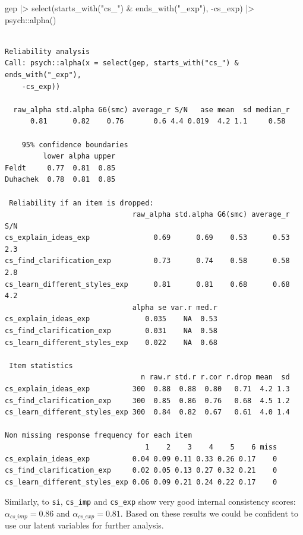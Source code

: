 \documentclass[
  letterpaper,
]{krantz}
\makeatletter
\newenvironment{Shaded}{\begin{snugshade}}{\end{snugshade}}
\newcommand{\FunctionTok}[1]{\textcolor[rgb]{0.28,0.35,0.67}{#1}}
\newcommand{\NormalTok}[1]{\textcolor[rgb]{0.00,0.23,0.31}{#1}}
\newcommand{\SpecialCharTok}[1]{\textcolor[rgb]{0.37,0.37,0.37}{#1}}
\newcommand{\StringTok}[1]{\textcolor[rgb]{0.13,0.47,0.30}{#1}}
\newenvironment{kframe}{%
\medskip{}
\setlength{\fboxsep}{.8em}
 \def\at@end@of@kframe{}%
 \ifinner\ifhmode%
  \def\at@end@of@kframe{\end{minipage}}%
  \begin{minipage}{\columnwidth}%
 \fi\fi%
 \def\FrameCommand##1{\hskip\@totalleftmargin \hskip-\fboxsep
 \colorbox{shadecolor}{##1}\hskip-\fboxsep
     \hskip-\linewidth \hskip-\@totalleftmargin \hskip\columnwidth}%
 \MakeFramed {\advance\hsize-\width
   \@totalleftmargin\z@ \linewidth\hsize
   \@setminipage}}%
 {\par\unskip\endMakeFramed%
 \at@end@of@kframe}
\renewenvironment{Shaded}{\begin{kframe}}{\end{kframe}}
\makeatother
\begin{document}
\begin{Shaded}
\begin{Highlighting}[]
\NormalTok{gep }\SpecialCharTok{|\textgreater{}}
  \FunctionTok{select}\NormalTok{(}\FunctionTok{starts\_with}\NormalTok{(}\StringTok{"cs\_"}\NormalTok{) }\SpecialCharTok{\&} \FunctionTok{ends\_with}\NormalTok{(}\StringTok{"\_exp"}\NormalTok{), }\SpecialCharTok{{-}}\NormalTok{cs\_exp) }\SpecialCharTok{|\textgreater{}}
\NormalTok{  psych}\SpecialCharTok{::}\FunctionTok{alpha}\NormalTok{()}
\end{Highlighting}
\end{Shaded}

\begin{verbatim}

Reliability analysis   
Call: psych::alpha(x = select(gep, starts_with("cs_") & ends_with("_exp"), 
    -cs_exp))

  raw_alpha std.alpha G6(smc) average_r S/N   ase mean  sd median_r
      0.81      0.82    0.76       0.6 4.4 0.019  4.2 1.1     0.58

    95% confidence boundaries 
         lower alpha upper
Feldt     0.77  0.81  0.85
Duhachek  0.78  0.81  0.85

 Reliability if an item is dropped:
                              raw_alpha std.alpha G6(smc) average_r S/N
cs_explain_ideas_exp               0.69      0.69    0.53      0.53 2.3
cs_find_clarification_exp          0.73      0.74    0.58      0.58 2.8
cs_learn_different_styles_exp      0.81      0.81    0.68      0.68 4.2
                              alpha se var.r med.r
cs_explain_ideas_exp             0.035    NA  0.53
cs_find_clarification_exp        0.031    NA  0.58
cs_learn_different_styles_exp    0.022    NA  0.68

 Item statistics 
                                n raw.r std.r r.cor r.drop mean  sd
cs_explain_ideas_exp          300  0.88  0.88  0.80   0.71  4.2 1.3
cs_find_clarification_exp     300  0.85  0.86  0.76   0.68  4.5 1.2
cs_learn_different_styles_exp 300  0.84  0.82  0.67   0.61  4.0 1.4

Non missing response frequency for each item
                                 1    2    3    4    5    6 miss
cs_explain_ideas_exp          0.04 0.09 0.11 0.33 0.26 0.17    0
cs_find_clarification_exp     0.02 0.05 0.13 0.27 0.32 0.21    0
cs_learn_different_styles_exp 0.06 0.09 0.21 0.24 0.22 0.17    0
\end{verbatim}

Similarly, to \texttt{si}, \texttt{cs\_imp} and \texttt{cs\_exp} show
very good internal consistency scores: \(\alpha_{cs\_imp} = 0.86\) and
\(\alpha_{cs\_exp} = 0.81\). Based on these results we could be
confident to use our latent variables for further analysis.
\end{document}
